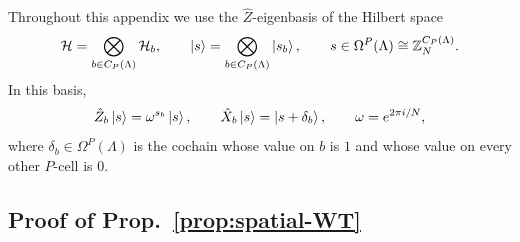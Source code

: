Throughout this appendix we use the \(\hat Z\)-eigenbasis of the Hilbert space
\begin{equation}
	\mathcal H=\bigotimes_{b\in C_P(\Lambda)}\mathcal H_b,
	\qquad
	\ket{s}
	=
	\bigotimes_{b\in C_P(\Lambda)}\ket{s_b},
	\qquad
	s\in \Omega^P(\Lambda)\cong \mathbb Z_N^{C_P(\Lambda)}.
\end{equation}
In this basis,
\begin{equation}
	\hat Z_b\ket{s}=\omega^{s_b}\ket{s},
	\qquad
	\hat X_b\ket{s}
	=
	\ket{s+\delta_b},
	\qquad
	\omega=e^{2\pi i/N},
	\label{eq:Z-basis}
\end{equation}
where \(\delta_b\in \Omega^P(\Lambda)\) is the cochain whose value on \(b\) is \(1\) and
whose value on every other \(P\)-cell is \(0\).



\subsection{Proof of Prop.~\ref{prop:spatial-WT}}\label{app:WTalgebra}
